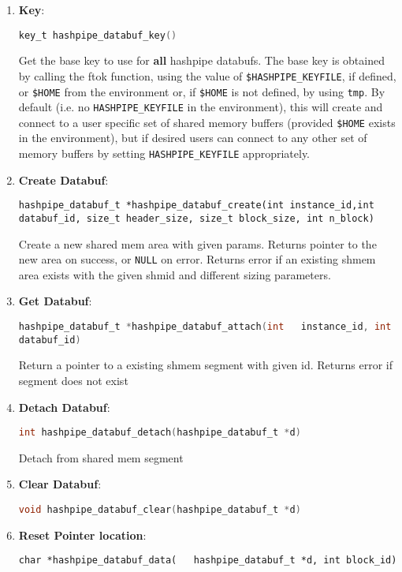 \documentclass[12pt]{article}
\def\clst{\lstinline[basicstyle=\ttfamily,breaklines=true,language=C]}
\begin{document}
\begin{enumerate}
\item {\bf Key}:

\clst{key_t hashpipe_databuf_key()}

Get the base key to use for {\bf all} hashpipe databufs.  The base key is
obtained by calling the ftok function, using the value of 
{\tt \$HASHPIPE\_KEYFILE}, if defined, or {\tt \$HOME} from the environment or, 
if {\tt \$HOME} is not defined, by using {\tt \/tmp}. By default 
(i.e. no {\tt HASHPIPE\_KEYFILE} in the environment), this will create and 
connect to a user specific set of shared memory buffers (provided {\tt \$HOME} 
exists in the environment), but if desired users can connect to any other set 
of memory buffers by setting {\tt HASHPIPE\_KEYFILE} appropriately.

\item {\bf Create Databuf}:

\begin{lstlisting}
hashpipe_databuf_t *hashpipe_databuf_create(int instance_id,int databuf_id, size_t header_size, size_t block_size, int n_block)
\end{lstlisting}

Create a new shared mem area with given params.  Returns pointer to the new
area on success, or \clst{NULL} on error.  Returns error if an existing shmem area
exists with the given shmid and different sizing parameters. 

\item {\bf Get Databuf}:

\clst{hashpipe_databuf_t *hashpipe_databuf_attach(int   instance_id, int databuf_id)}

Return a pointer to a existing shmem segment with given id. Returns error 
if segment does not exist 

\item {\bf Detach Databuf}:

\clst{int hashpipe_databuf_detach(hashpipe_databuf_t *d)}

Detach from shared mem segment

\item {\bf Clear Databuf}:

\clst{void hashpipe_databuf_clear(hashpipe_databuf_t *d)}

\item {\bf Reset Pointer location}:
\begin{lstlisting}
char *hashpipe_databuf_data(   hashpipe_databuf_t *d, int block_id)
\end{lstlisting}


\end{enumerate}
\end{document}
